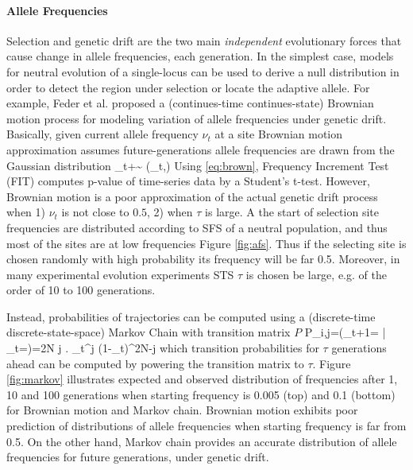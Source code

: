 \documentclass[11pt]{article}
\begin{document}
\paragraph{Allele Frequencies}
Selection and genetic drift are the two main 
\emph{independent} evolutionary 
forces that cause change in allele frequencies, each 
generation. 
In the simplest case, models for neutral evolution of a 
single-locus can be 
used to derive a null distribution in order to detect the 
region under 
selection or locate the 
adaptive allele.
For example, Feder et al. 
\cite{feder2014Identifying} proposed a (continues-time 
continues-state) 
Brownian motion process for modeling variation of allele 
frequencies under 
genetic drift. Basically, given current allele frequency 
$\nu_t$ at a site 
Brownian motion approximation assumes future-generations allele 
frequencies are drawn from the Gaussian distribution
\beq
\nu_{t+\tau}\sim 
\Nc\left(\nu_t,\tau\right) 
\label{eq:brown}
\eeq
Using \eqref{eq:brown}, Frequency Increment Test (FIT) 
\cite{feder2014Identifying} computes p-value of 
time-series data by a Student's t-test. However, Brownian 
motion is a poor 
approximation of the actual genetic drift process when 1) 
$\nu_t$ is not close 
to $0.5$, 2) when $\tau$ is large. A the start of selection 
site frequencies 
are distributed according to SFS of a neutral population, and 
thus most of the 
sites are at low frequencies Figure \ref{fig:afs}. Thus if the selecting site 
is 
chosen randomly 
with high probability its frequency will be far 0.5. 
Moreover, in many 
experimental evolution experiments STS $\tau$ is chosen be 
large, e.g. of the order of 10 to 
100 generations.


Instead, probabilities of trajectories can be computed using 
a 
(discrete-time discrete-state-space) Markov Chain with 
transition matrix $P$
\beq
P_{i,j}=\pr\left(\nu_{t+1}= \left| 
\nu_{t}=\right)={2N 
	\choose j} \right. 
\nu_{t}^j (1-\nu_{t})^{2N-j}  
\eeq
which transition probabilities for $\tau$ generations ahead 
can be computed by 
powering the transition matrix to $\tau$.
Figure \ref{fig:markov} illustrates expected and observed distribution of 
frequencies after 
1, 10 and 100 generations when starting frequency is 0.005 (top) and 0.1 
(bottom) for Brownian motion and Markov chain. Brownian motion 
exhibits poor prediction of distributions of allele frequencies when starting 
frequency is far from 
0.5. On the other hand, Markov chain provides an accurate distribution of 
allele frequencies 
for future generations, under genetic drift.
\end{document}
